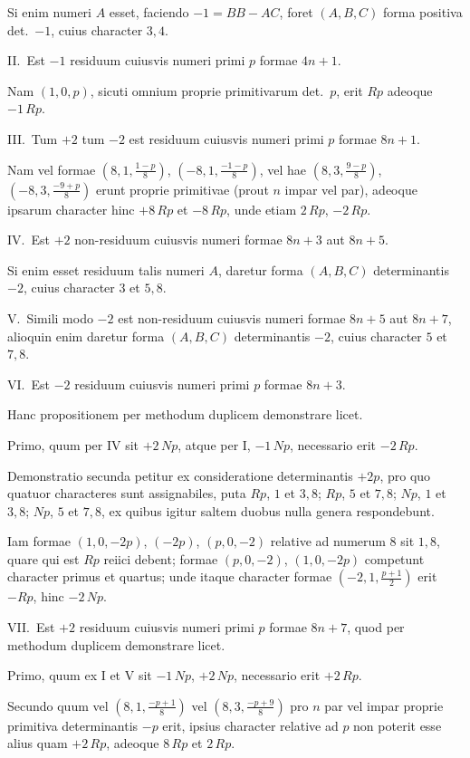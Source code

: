 \documentclass[12pt,a4paper]{article}
\theoremstyle{plain}
\theoremstyle{definition}
\theoremstyle{remark}
\begin{document}
Si enim numeri $A$ esset, faciendo $-1 = BB - AC$, foret $(A,B,C)$ forma positiva det.\ $-1$, cuius character $3, 4$.

\textsc{II.}\ Est $-1$ residuum cuiusvis numeri primi $p$ formae $4n+1$.

Nam $(1,0,p)$, sicuti omnium proprie primitivarum det.\ $p$, erit $Rp$ adeoque $-1\,Rp$.

\textsc{III.}\ Tum $+2$ tum $-2$ est residuum cuiusvis numeri primi $p$ formae $8n+1$.

Nam vel formae $(8,1,\frac{1-p}{8})$, $(-8,1,\frac{-1-p}{8})$, vel hae $(8,3,\frac{9-p}{8})$, $(-8,3,\frac{-9+p}{8})$ erunt proprie primitivae (prout $n$ impar vel par), adeoque ipsarum character hinc $+8\,Rp$ et $-8\,Rp$, unde etiam $2\,Rp$, $-2\,Rp$.

\textsc{IV.}\ Est $+2$ non-residuum cuiusvis numeri formae $8n+3$ aut $8n+5$.

Si enim esset residuum talis numeri $A$, daretur forma $(A,B,C)$ determinantis $-2$, cuius character $3$ et $5, 8$.

\textsc{V.}\ Simili modo $-2$ est non-residuum cuiusvis numeri formae $8n+5$ aut $8n+7$, alioquin enim daretur forma $(A,B,C)$ determinantis $-2$, cuius character $5$ et $7, 8$.

\textsc{VI.}\ Est $-2$ residuum cuiusvis numeri primi $p$ formae $8n+3$.

Hanc propositionem per methodum duplicem demonstrare licet.

Primo, quum per IV sit $+2\,Np$, atque per I, $-1\,Np$, necessario erit $-2\,Rp$.

Demonstratio secunda petitur ex consideratione determinantis $+2p$, pro quo quatuor characteres sunt assignabiles, puta $Rp$, $1$ et $3, 8$; $Rp$, $5$ et $7, 8$; $Np$, $1$ et $3, 8$; $Np$, $5$ et $7, 8$, ex quibus igitur saltem duobus nulla genera respondebunt.

Iam formae $(1,0,-2p)$, $(-2p)$, $(p,0,-2)$ relative ad numerum $8$ sit $1, 8$, quare qui est $Rp$ reiici debent; formae $(p,0,-2)$, $(1,0,-2p)$ competunt character primus et quartus; unde itaque character formae $(-2,1,\frac{p+1}{2})$ erit $-Rp$, hinc $-2\,Np$.

\textsc{VII.}\ Est $+2$ residuum cuiusvis numeri primi $p$ formae $8n+7$, quod per methodum duplicem demonstrare licet.

Primo, quum ex I et V sit $-1\,Np$, $+2\,Np$, necessario erit $+2\,Rp$.

Secundo quum vel $(8,1,\frac{-p+1}{8})$ vel $(8,3,\frac{-p+9}{8})$ pro $n$ par vel impar proprie primitiva determinantis $-p$ erit, ipsius character relative ad $p$ non poterit esse alius quam $+2\,Rp$, adeoque $8\,Rp$ et $2\,Rp$.
\end{document}
